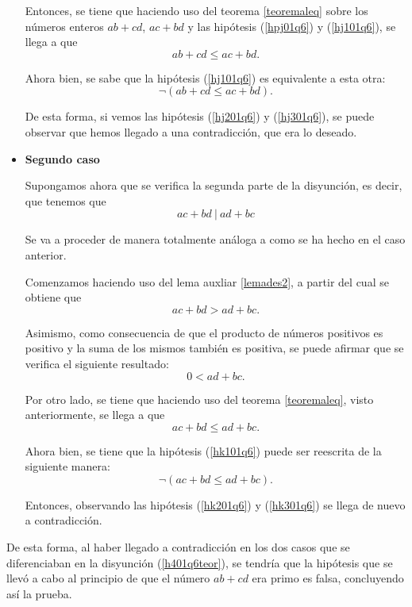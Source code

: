 \begin{demostracion}
\begin{itemize}
    Entonces, se tiene que haciendo uso del teorema \ref{teoremaleq} sobre
    los números enteros \(ab+cd\), \(ac+bd\) y las hipótesis (\ref{hpj01q6})
    y (\ref{hj101q6}), se llega a que
    \begin{equation}\tag{hj2}\label{hj201q6}
      ab+cd≤ac+bd.
    \end{equation}

    Ahora bien, se sabe que la hipótesis (\ref{hj101q6}) es equivalente a
    esta otra:
    \begin{equation}\tag{hj3}\label{hj301q6}
      ¬(ab+cd≤ac+bd).
    \end{equation}

    De esta forma, si vemos las hipótesis (\ref{hj201q6}) y (\ref{hj301q6}),
    se puede observar que hemos llegado a una contradicción, que era lo
    deseado.

  \item \textbf{Segundo caso}

    Supongamos ahora que se verifica la segunda parte de la disyunción, es
    decir, que tenemos que
    \begin{equation}\tag{hk}\label{hk01q6teor}
      ac+bd\ |\ ad+bc
    \end{equation}

    Se va a proceder de manera totalmente análoga a como se ha hecho en el
    caso anterior.

    Comenzamos haciendo uso del lema auxliar \ref{lemades2}, a partir del
    cual se obtiene que
     \begin{equation}\tag{hk1}\label{hk101q6}
      ac+bd > ad+bc.
    \end{equation}

    Asimismo, como consecuencia de que el producto de números positivos
    es positivo y la suma de los mismos también es positiva, se puede
    afirmar que se verifica el siguiente resultado:
    \begin{equation}
      0<ad+bc.
    \end{equation}

    Por otro lado, se tiene que haciendo uso del teorema \ref{teoremaleq},
    visto anteriormente, se llega a que
    \begin{equation}\tag{hk2}\label{hk201q6}
      ac+bd≤ad+bc.
    \end{equation}

    Ahora bien, se tiene que la hipótesis (\ref{hk101q6}) puede ser
    reescrita de la siguiente manera:
    \begin{equation}\tag{hk3}\label{hk301q6}
      ¬(ac+bd≤ad+bc).
    \end{equation}

    Entonces, observando las hipótesis (\ref{hk201q6}) y (\ref{hk301q6}) se
    llega de nuevo a contradicción.
  \end{itemize}

  De esta forma, al haber llegado a contradicción en los dos casos que se
  diferenciaban en la disyunción (\ref{h401q6teor}), se tendría que la
  hipótesis que se llevó a cabo al principio de que el número \(ab+cd\) era
  primo es falsa, concluyendo así la prueba.
\end{demostracion}

